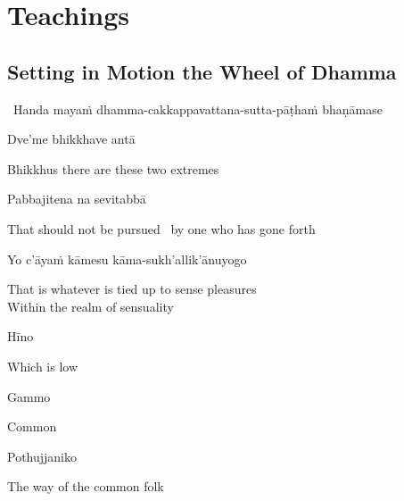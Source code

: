 
\ifdigitalversion
\else
\fi

\chapter{Teachings}



\section{Setting in Motion the Wheel of Dhamma}
\label{wheel-of-dhamma-abridged}

\begin{leader}
  \anglebracketleft\ \hspace{-0.5mm}Handa mayaṁ dhamma-cakkappavattana-sutta-pāṭhaṁ \mbox{bhaṇāmase}~\hspace{-0.5mm}\anglebracketright\
\end{leader}

Dve'me bhikkhave antā

\begin{english}
  Bhikkhus there are these two extremes
\end{english}

Pabbajitena na sevitabbā

\begin{english}
  That should not be pursued \breathmark\ by one who has gone forth
\end{english}

Yo c'āyaṁ kāmesu kāma-sukh'allik'ānuyogo

\begin{english}
  That is whatever is tied up to sense pleasures\\
  Within the realm of sensuality
\end{english}

Hīno

\begin{english}
  Which is low
\end{english}

Gammo

\begin{english}
  Common
\end{english}

Pothujjaniko

\begin{english}
  The way of the common folk
\end{english}

